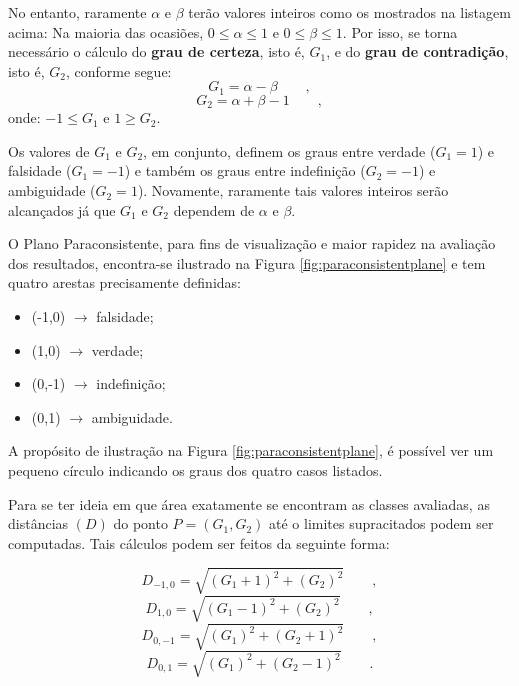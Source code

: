 			\par No entanto, raramente $\alpha$ e $\beta$ terão valores inteiros como os mostrados na listagem acima: Na maioria das ocasiões, $0 \leqslant \alpha \leqslant 1$ e $0 \leqslant \beta \leqslant 1$. Por isso, se torna necessário o cálculo do \textbf{grau de certeza}, isto é, $G_1$, e do \textbf{grau de contradição}, isto é, $G_2$, conforme segue:
			\begin{equation}
				G_1=\alpha-\beta  \qquad,
			\end{equation}
			\begin{equation}
				G_2=\alpha+\beta-1 \qquad,
			\end{equation}
			onde: $-1 \leqslant G_1$ e  $1 \geqslant G_2$.
			
			\par Os valores de $G_1$ e $G_2$, em conjunto, definem os graus entre verdade ($G_1=1$) e falsidade ($G_1=-1$) e também os graus entre indefinição ($G_2=-1$) e ambiguidade ($G_2=1$). Novamente, raramente tais valores inteiros serão alcançados já que $G_1$ e $G_2$ dependem de $\alpha$ e $\beta$.
	
			\par O Plano Paraconsistente, para fins de visualização e maior rapidez na avaliação dos resultados, encontra-se ilustrado na Figura \ref{fig:paraconsistentplane} e tem quatro arestas precisamente definidas:
			\begin{itemize}
				\item (-1,0) $\rightarrow$ falsidade;
				\item (1,0) $\rightarrow$ verdade;
				\item (0,-1) $\rightarrow$ indefinição;
				\item (0,1) $\rightarrow$ ambiguidade.
			\end{itemize}
			\par A propósito de ilustração na Figura \ref{fig:paraconsistentplane}, é possível ver um pequeno círculo indicando os graus dos quatro casos listados.
			
			\par Para se ter ideia em que área exatamente se encontram as classes avaliadas, as distâncias $(D)$ do ponto $P=(G_1,G_2)$ até o limites supracitados podem ser computadas. Tais cálculos podem ser feitos da seguinte forma:
	
			\begin{equation}
				D_{-1,0}=\sqrt{(G_1+1)^2+(G_2)^2}\qquad,
			\end{equation}
			\begin{equation}
				D_{1,0}=\sqrt{(G_1-1)^2+(G_2)^2}\qquad,
			\end{equation}
			\begin{equation}
				D_{0,-1}=\sqrt{(G_1)^2+(G_2+1)^2}\qquad,		
			\end{equation}
			\begin{equation}
				D_{0,1}=\sqrt{(G_1)^2+(G_2-1)^2}\qquad.
			\end{equation}		
			
